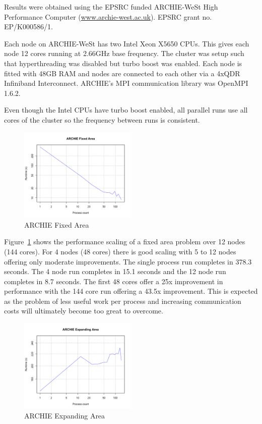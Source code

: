 Results were obtained using the EPSRC funded ARCHIE-WeSt High Performance
Computer (\url{www.archie-west.ac.uk}). EPSRC grant no. EP/K000586/1.

Each node on ARCHIE-WeSt has two Intel Xeon X5650 CPUs. This gives each node 12
cores running at 2.66GHz base frequency. The cluster was setup such that
hyperthreading was disabled but turbo boost was enabled. Each node is fitted
with 48GB RAM and nodes are connected to each other via a 4xQDR Infiniband
Interconnect. ARCHIE's MPI communication library was OpenMPI 1.6.2.

Even though the Intel CPUs have turbo boost enabled, all parallel runs use all
cores of the cluster so the frequency between runs is consistent.

\begin{figure}
    \includegraphics[width=0.5\textwidth]{graphs/ARCHIE-fixed-area.png}
    \caption{ARCHIE Fixed Area}
    \label{fig:archiefixedarea}
\end{figure}

Figure~\ref{fig:archiefixedarea} shows the performance scaling of a fixed area
problem over 12 nodes (144 cores). For 4 nodes (48 cores) there is good scaling
with 5 to 12 nodes offering only moderate improvements. The single process run
completes in 378.3 seconds. The 4 node run completes in 15.1 seconds and the 12
node run completes in 8.7 seconds. The first 48 cores offer a 25x improvement in
performance with the 144 core run offering a 43.5x improvement. This is expected
as the problem of less useful work per process and increasing communication
costs will ultimately become too great to overcome.

\begin{figure}
    \includegraphics[width=0.5\textwidth]{graphs/ARCHIE-expanding-area.png}
    \caption{ARCHIE Expanding Area}
    \label{fig:archieexpandingarea}
\end{figure}

